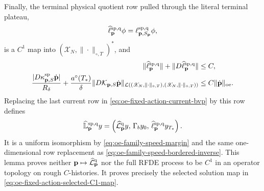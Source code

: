 \begin{lemma}
Finally, the terminal physical quotient row pulled through the literal
terminal plateau,
\begin{equation}
 \widehat\ell_{\mathbf p}^{\rm sp,q}\phi
 =\ell_{\mathbf p,S_{\mathbf p}}^{\rm sp,q}\phi,          \label{eq:oe-fixed-action-physical-row}
\end{equation}
is a \(C^1\) map into
\((\mathscr X_N,\|\cdot\|_{\circ,T})^*\), and
\begin{align}
 \|\widehat\ell_{\mathbf p}^{\rm sp,q}\|
 +\|D\widehat\ell_{\mathbf p}^{\rm sp,q}\|
 &\le C,\notag\\
 \frac{|D\kappa_{\mathbf p,S}^{\rm sp}
              \dot{\mathbf p}|}{R_\delta}
 +\frac{a^\circ(T_*)}{\delta}
       \|D\mathcal K_{\mathbf p,S}
              \dot{\mathbf p}\|_
       {\mathcal L((\mathscr X_N,\|\cdot\|_{\circ,T}),
                   (\mathscr X_N,\|\cdot\|_{\circ,T}))}
 &\le C\|\dot{\mathbf p}\|_{\rm oe}.           \label{eq:oe-fixed-action-terminal-row-jet}
\end{align}
Replacing the last current row in
\cref{eq:oe-fixed-action-current-bvp} by this row defines
\begin{equation}
 \widehat{\mathbb L}_{\mathbf p}^{\rm sp,q}y
 =\left(\widehat{\mathcal L}_{\mathbf p}^{\rm q}y,\,
       \Gamma_by_0,\,
       \widehat\ell_{\mathbf p}^{\rm sp,q}y_{T_*}\right).
                                                        \label{eq:oe-fixed-action-physical-bvp}
\end{equation}
It is a uniform isomorphism by
\cref{eq:oe-family-speed-margin} and the same one-dimensional row
replacement as
\cref{eq:oe-family-speed-bordered-inverse}.
This lemma proves neither
\(\mathbf p\mapsto\widehat{\mathcal L}_{\mathbf p}^{\rm q}\) nor the
full RFDE process to be \(C^1\) in an operator topology on rough
\(C\)-histories.  It proves precisely the selected solution map in
\cref{eq:oe-fixed-action-selected-C1-map}.
\end{lemma}

